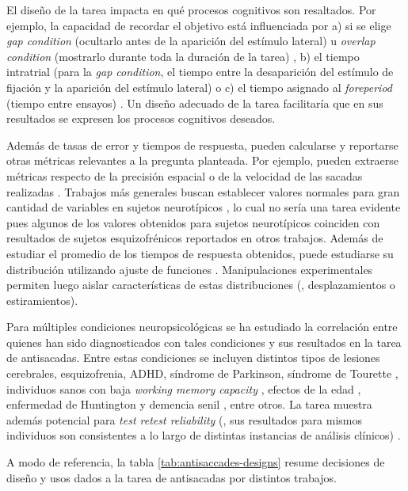 El diseño de la tarea impacta en qué procesos cognitivos son resaltados.
Por ejemplo, la capacidad de recordar el objetivo está influenciada por a) si
se elige \textit{gap condition} (ocultarlo antes de la aparición del estímulo
lateral) u \textit{overlap condition} (mostrarlo durante toda la duración de
la tarea) \cite{munoz_2004_look_away}, b) el tiempo intratrial (para la
\textit{gap condition}, el tiempo entre la desaparición del estímulo de
fijación y la aparición del estímulo lateral) \cite{munoz_2004_look_away} o
c) el tiempo asignado al \textit{foreperiod} (tiempo entre ensayos)
\cite{unsworth_2011_distribution_analysis}.
Un diseño adecuado de la tarea facilitaría que en sus resultados se expresen
los procesos cognitivos deseados.

Además de tasas de error y tiempos de respuesta, pueden calcularse y reportarse
otras métricas relevantes a la pregunta planteada.
Por ejemplo, pueden extraerse métricas respecto de la precisión espacial
\cite{olincy_1997_age_diminishes_performance} o de la velocidad de las
sacadas realizadas \cite{plomecka_2020_retest_reliability}.
Trabajos más generales buscan establecer valores normales para gran cantidad de
variables en sujetos neurotípicos \cite{smyrnis_2002_big_sample}, lo cual no
sería una tarea evidente pues algunos de los valores obtenidos para sujetos
neurotípicos coinciden con resultados de sujetos esquizofrénicos reportados en
otros trabajos.
Además de estudiar el promedio de los tiempos de respuesta obtenidos, puede
estudiarse su distribución utilizando ajuste de funciones
\cite{unsworth_2011_distribution_analysis}.
Manipulaciones experimentales permiten luego aislar características de estas
distribuciones (\eg, desplazamientos o estiramientos).

Para múltiples condiciones neuropsicológicas se ha estudiado la correlación
entre quienes han sido diagnosticados con tales condiciones y sus resultados en
la tarea de antisacadas.
Entre estas condiciones se incluyen distintos tipos de lesiones cerebrales,
esquizofrenia, ADHD, síndrome de Parkinson, síndrome de Tourette
\cite{munoz_2004_look_away}, individuos sanos con baja \textit{working
memory capacity} \cite{unsworth_2011_distribution_analysis}, efectos de la
edad \cite{olincy_1997_age_diminishes_performance,
plomecka_2020_retest_reliability}, enfermedad de Huntington y demencia senil
\cite{smyrnis_2002_big_sample}, entre otros.
La tarea muestra además potencial para \textit{test retest reliability}
(\ie, sus resultados para mismos individuos son consistentes a lo largo de
distintas instancias de análisis clínicos)
\cite{plomecka_2020_retest_reliability}. 

A modo de referencia, la tabla \ref{tab:antisaccades-designs} resume decisiones de diseño y usos dados a la tarea de antisacadas por distintos trabajos.


